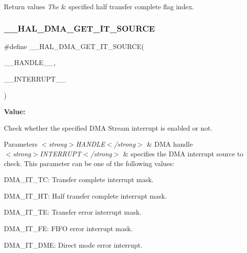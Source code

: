 \begin{DoxyRetVals}{Return values}
{\em The} & specified half transfer complete flag index. \\
\hline
\end{DoxyRetVals}
\mbox{\label{group___d_m_a_ga206f24e6bee4600515b9b6b1ec79365b}} 
\subsubsection{\texorpdfstring{\_\_HAL\_DMA\_GET\_IT\_SOURCE}{\_\_HAL\_DMA\_GET\_IT\_SOURCE}}
{\footnotesize\ttfamily \#define \+\_\+\+\_\+\+H\+A\+L\+\_\+\+D\+M\+A\+\_\+\+G\+E\+T\+\_\+\+I\+T\+\_\+\+S\+O\+U\+R\+CE(\begin{DoxyParamCaption}\item[{}]{\+\_\+\+\_\+\+H\+A\+N\+D\+L\+E\+\_\+\+\_\+,  }\item[{}]{\+\_\+\+\_\+\+I\+N\+T\+E\+R\+R\+U\+P\+T\+\_\+\+\_\+ }\end{DoxyParamCaption})}

{\bfseries Value\+:}
\begin{DoxyCode}{0}

\end{DoxyCode}


Check whether the specified D\+MA Stream interrupt is enabled or not. 


\begin{DoxyParams}{Parameters}
{\em $<$strong$>$\+H\+A\+N\+D\+L\+E$<$/strong$>$} & D\+MA handle \\
\hline
{\em $<$strong$>$\+I\+N\+T\+E\+R\+R\+U\+P\+T$<$/strong$>$} & specifies the D\+MA interrupt source to check. This parameter can be one of the following values\+: \begin{DoxyItemize}
\item D\+M\+A\+\_\+\+I\+T\+\_\+\+TC\+: Transfer complete interrupt mask. \item D\+M\+A\+\_\+\+I\+T\+\_\+\+HT\+: Half transfer complete interrupt mask. \item D\+M\+A\+\_\+\+I\+T\+\_\+\+TE\+: Transfer error interrupt mask. \item D\+M\+A\+\_\+\+I\+T\+\_\+\+FE\+: F\+I\+FO error interrupt mask. \item D\+M\+A\+\_\+\+I\+T\+\_\+\+D\+ME\+: Direct mode error interrupt. \end{DoxyItemize}
\\
\hline
\end{DoxyParams}

